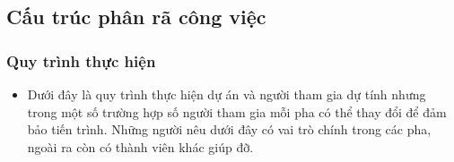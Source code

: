 \documentclass[12pt]{article}
\begin{document}
\subsection{Cấu trúc phân rã công việc}
\subsubsection{Quy trình thực hiện}
\begin{itemize}[label=-, leftmargin=1cm]
    \item Dưới đây là quy trình thực hiện dự án và người tham gia dự tính nhưng trong một số trường hợp số người tham gia mỗi pha có thể thay đổi để đảm bảo tiến trình. Những người nêu dưới đây có vai trò chính trong các pha, ngoài ra còn có thành viên khác giúp đỡ.
\end{itemize}
\end{document}
